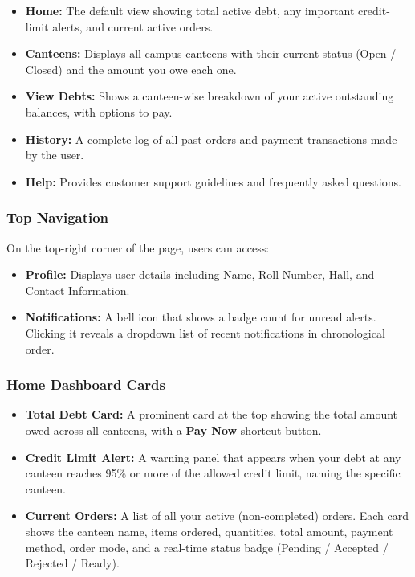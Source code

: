\documentclass[a4paper,12pt]{article}
\begin{document}
\begin{itemize}
    \item \textbf{Home:} The default view showing total active debt, any important credit-limit alerts, and current active orders.
    \item \textbf{Canteens:} Displays all campus canteens with their current status (Open / Closed) and the amount you owe each one.
    \item \textbf{View Debts:} Shows a canteen-wise breakdown of your active outstanding balances, with options to pay.
    \item \textbf{History:} A complete log of all past orders and payment transactions made by the user.
    \item \textbf{Help:} Provides customer support guidelines and frequently asked questions.
\end{itemize}

\subsubsection*{Top Navigation}

On the top-right corner of the page, users can access:

\begin{itemize}
    \item \textbf{Profile:} Displays user details including Name, Roll Number, Hall, and Contact Information.
    \item \textbf{Notifications:} A bell icon that shows a badge count for unread alerts. Clicking it reveals a dropdown list of recent notifications in chronological order.
\end{itemize}

\subsubsection*{Home Dashboard Cards}

\begin{itemize}
    \item \textbf{Total Debt Card:} A prominent card at the top showing the total amount owed across all canteens, with a \textbf{Pay Now} shortcut button.
    \item \textbf{Credit Limit Alert:} A warning panel that appears when your debt at any canteen reaches 95\% or more of the allowed credit limit, naming the specific canteen.
    \item \textbf{Current Orders:} A list of all your active (non-completed) orders. Each card shows the canteen name, items ordered, quantities, total amount, payment method, order mode, and a real-time status badge (Pending / Accepted / Rejected / Ready).
\end{itemize}
\end{document}
